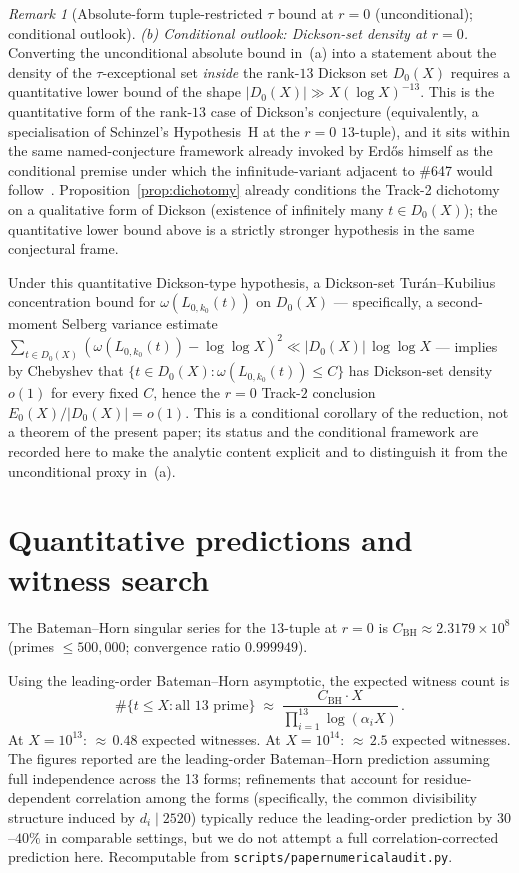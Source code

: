 \documentclass[11pt]{article}
\renewcommand{\_}{\origunderscore\allowbreak}
\theoremstyle{definition}
\theoremstyle{remark}
\newtheorem{remark}[theorem]{Remark}
\begin{document}
\begin{remark}[Absolute-form tuple-restricted $\tau$ bound at $r=0$ (unconditional); conditional outlook]
\emph{(b) Conditional outlook: Dickson-set density at $r=0$.}
Converting the unconditional absolute bound in~(a) into a statement
about the density of the $\tau$-exceptional set \emph{inside} the
rank-$13$ Dickson set $D_0(X)$ requires a quantitative lower bound
of the shape $|D_0(X)|\gg X(\log X)^{-13}$. This is the quantitative
form of the rank-$13$ case of Dickson's conjecture (equivalently, a
specialisation of Schinzel's Hypothesis~H at the $r=0$ $13$-tuple),
and it sits within the same named-conjecture framework already
invoked by Erd\H{o}s himself as the conditional premise under which
the infinitude-variant adjacent to \#647 would follow~\cite{Bloom647}.
Proposition~\ref{prop:dichotomy} already conditions the Track-2
dichotomy on a qualitative form of Dickson (existence of infinitely
many $t\in D_0(X)$); the quantitative lower bound above is a
strictly stronger hypothesis in the same conjectural frame.

Under this quantitative Dickson-type hypothesis, a Dickson-set
Tur\'an--Kubilius concentration bound for $\omega(L_{0,k_0}(t))$
on $D_0(X)$ --- specifically, a second-moment Selberg variance
estimate
$\sum_{t\in D_0(X)} (\omega(L_{0,k_0}(t))-\log\log X)^{2}
 \ll |D_0(X)|\,\log\log X$
--- implies by Chebyshev that
$\{t\in D_0(X):\omega(L_{0,k_0}(t))\le C\}$ has Dickson-set
density $o(1)$ for every fixed $C$, hence the $r=0$ Track-$2$
conclusion $E_0(X)/|D_0(X)|=o(1)$. This is a conditional corollary
of the reduction, not a theorem of the present paper; its status
and the conditional framework are recorded here to make the
analytic content explicit and to distinguish it from the
unconditional proxy in~(a).
\end{remark}

\section{Quantitative predictions and witness search}\label{sec:BH}

The Bateman--Horn singular series for the $13$-tuple at $r=0$ is
$C_{\mathrm{BH}}\approx 2.3179\times 10^8$ (primes $\le 500{,}000$;
convergence ratio $0.999949$).

Using the leading-order Bateman--Horn asymptotic, the expected
witness count is
\[
\#\{t\le X:\text{all 13 prime}\}
  \;\approx\; \frac{C_{\mathrm{BH}}\cdot X}
  {\prod_{i=1}^{13}\log(\alpha_i X)}\,.
\]
At $X=10^{13}$: ${\approx}\,0.48$ expected witnesses.
At $X=10^{14}$: ${\approx}\,2.5$ expected witnesses. The figures
reported are the leading-order Bateman--Horn prediction assuming full
independence across the 13 forms; refinements that account for
residue-dependent correlation among the forms (specifically, the
common divisibility structure induced by $d_i \mid 2520$) typically
reduce the leading-order prediction by $30$--$40\%$ in comparable
settings, but we do not attempt a full correlation-corrected prediction
here. Recomputable from \texttt{scripts/paper\_numerical\_audit.py}.
\end{document}

